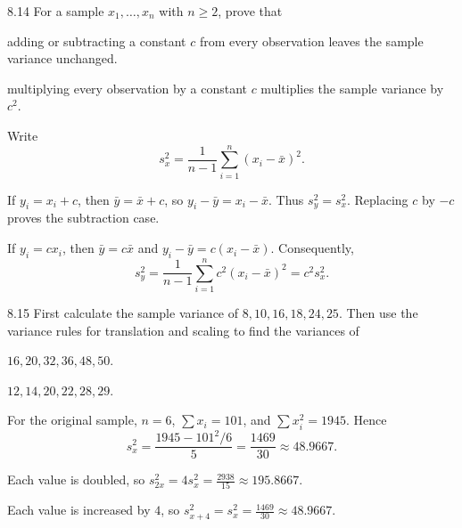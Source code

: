 \documentclass[11pt,oneside]{article}
\begin{document}
\begin{exercise}{8.14}
For a sample $x_1, \ldots, x_n$ with $n\ge2$, prove that
\begin{exercisesubparts}
\item adding or subtracting a constant $c$ from every observation leaves the sample variance unchanged.
\item multiplying every observation by a constant $c$ multiplies the sample variance by $c^2$.
\end{exercisesubparts}
\end{exercise}
\begin{solution}
Write
\[
s_x^2=\frac{1}{n-1}\sum_{i=1}^n(x_i-\bar x)^2.
\]
\begin{exercisesubparts}
\item If $y_i=x_i+c$, then $\bar y=\bar x+c$, so $y_i-\bar y=x_i-\bar x$. Thus $\boxed{s_y^2=s_x^2}$. Replacing $c$ by $-c$ proves the subtraction case.
\item If $y_i=cx_i$, then $\bar y=c\bar x$ and $y_i-\bar y=c(x_i-\bar x)$. Consequently,
\[
s_y^2=\frac1{n-1}\sum_{i=1}^n c^2(x_i-\bar x)^2
=\boxed{c^2s_x^2}.
\]
\end{exercisesubparts}
\end{solution}

\begin{exercise}{8.15}
First calculate the sample variance of $8, 10, 16, 18, 24, 25$. Then use the variance rules for translation and scaling to find the variances of
\begin{exercisesubparts}
\item $16, 20, 32, 36, 48, 50$.
\item $12, 14, 20, 22, 28, 29$.
\end{exercisesubparts}
\end{exercise}
\begin{solution}
For the original sample, $n=6$, $\displaystyle \sum x_i=101$, and $\displaystyle \sum x_i^2=1945$. Hence
\[
s_x^2=\frac{1945-101^2/6}{5}=\boxed{\frac{1469}{30}\approx48.9667}.
\]
\begin{exercisesubparts}
\item Each value is doubled, so $\boxed{s_{2x}^2=4s_x^2=\frac{2938}{15}\approx195.8667}$.
\item Each value is increased by $4$, so $\boxed{s_{x+4}^2=s_x^2=\frac{1469}{30}\approx48.9667}$.
\end{exercisesubparts}
\end{solution}
\end{document}
